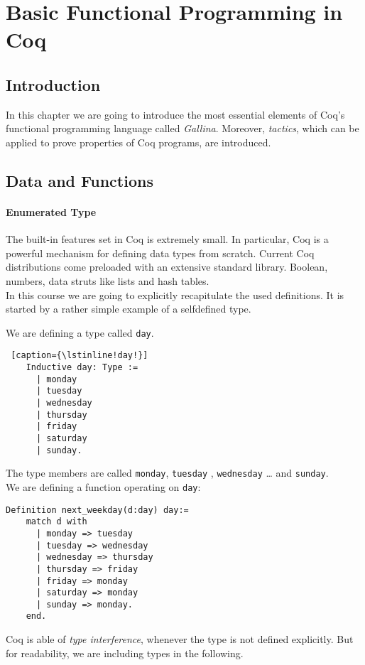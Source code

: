 \section{Basic Functional Programming in Coq}



\subsection{Introduction}

In this chapter we are going to introduce the most essential elements of Coq's functional programming language called {\itshape  Gallina}. 
Moreover, {\itshape tactics}, which can be applied to prove properties of Coq programs, are introduced.


\subsection{Data and Functions}
\label{subSec:DataAndFuctions}

 \paragraph{Enumerated Type}
 
 
  The built-in features set in Coq is extremely small. In particular, Coq is a powerful mechanism for defining data types from scratch.
  Current Coq distributions come preloaded with an extensive standard library.
  Boolean, numbers, data struts like lists and hash tables.\\
  
  In this course we are going to explicitly recapitulate the used definitions. 
  It is started by a rather simple example of a selfdefined type.  
   
  
  \begin{example}
  We are defining a type called \lstinline!day!.~\\\vspace{-10mm}
  {\normalfont \begin{lstlisting} [caption={\lstinline!day!}] 
    Inductive day: Type :=
	  | monday
	  | tuesday
	  | wednesday
	  | thursday
	  | friday
	  | saturday
	  | sunday.
  \end{lstlisting}}
  The type members are called \lstinline!monday!, \lstinline!tuesday! , \lstinline!wednesday! \ldots{} and \lstinline!sunday!.\\
  We are defining a function operating on \lstinline!day!: 
  {\normalfont \begin{lstlisting}[caption = {\lstinline! next_weekday!}]
  Definition next_weekday(d:day) day:=
    match d with 
	  | monday => tuesday
	  | tuesday => wednesday
	  | wednesday => thursday
	  | thursday => friday
	  | friday => monday
	  | saturday => monday
	  | sunday => monday.
    end.  
  \end{lstlisting}}
  \end{example}
  Coq is able of {\itshape type  interference}, whenever the type is not defined explicitly.
  But for readability, we are including types in the following.\\   
  
